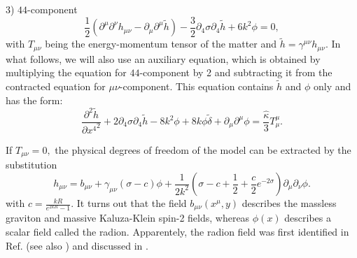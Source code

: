 \documentclass[a4paper,12pt]{article}
\begin{document}
 3) $4 4$-component
\begin{equation}\label{4-4}
\frac{1}{2}(\partial^\mu \partial^\nu  h_{\mu\nu} - \partial_\mu
\partial^\mu \tilde h ) - \frac{3}{2}\partial_4 \sigma \partial_4 \tilde h
+ 6 k^2 \phi =0,
\end{equation}
with $T_{\mu\nu}$ being the energy-momentum tensor of the matter
and $\tilde h=\gamma^{\mu\nu}h_{\mu\nu}$. In what follows, we will
also use an auxiliary equation, which is obtained by multiplying
the equation for $44$-component by 2 and subtracting it from the
contracted equation for $\mu\nu$-component. This equation contains
$\tilde h$ and $\phi$ only and has the form:
\begin{equation}\label{contracted-44}
\frac{\partial^2 \tilde h}{\partial {x^4}^2}  + 2\partial_4 \sigma \partial_4 \tilde h
  -8k^2 \phi+ 8k \phi \tilde \delta + \partial_\mu \partial^\mu \phi =
\frac{\hat \kappa}{3} T_{\mu}^{\mu}.
\end{equation}

If $ T_{\mu\nu}=0,$ the physical degrees of freedom of  the model
can be extracted by the substitution \cite{BKSV}
\begin{equation}\label{substitution}
 h_{\mu\nu} =  b_{\mu\nu} + \gamma_{\mu\nu}(\sigma - c)\phi +
 \frac{1}{2k^2} \left(\sigma - c +\frac{1}{2} +
 \frac{c}{2}e^{-2\sigma}\right) \partial_\mu \partial_\nu \phi.
\end{equation}
with $c=\frac{kR}{e^{2kR}-1}$. It turns out that the field
$b_{\mu\nu}(x^{\mu},y)$ describes the massless graviton
\cite{RS1,RS2} and massive Kaluza-Klein spin-2 fields, whereas
$\phi (x)$ describes a scalar field called the radion.
Apparentely, the radion field was first identified in Ref.
\cite{ADM} (see also \cite{Sundr}) and discussed
in  \cite{CGR,CGRT,wise2,Das}.
\end{document}
